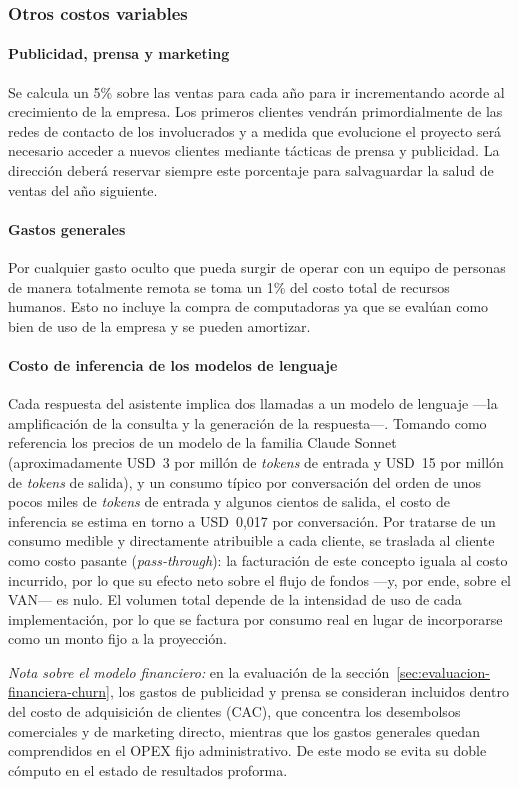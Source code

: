 \subsubsection{Otros costos variables}

\paragraph{Publicidad, prensa y marketing}
Se calcula un 5\% sobre las ventas para cada año para ir incrementando acorde al crecimiento de la empresa. Los primeros clientes vendrán primordialmente de las redes de contacto de los involucrados y a medida que evolucione el proyecto será necesario acceder a nuevos clientes mediante tácticas de prensa y publicidad. La dirección deberá reservar siempre este porcentaje para salvaguardar la salud de ventas del año siguiente.

\paragraph{Gastos generales}
Por cualquier gasto oculto que pueda surgir de operar con un equipo de personas de manera totalmente remota se toma un 1\% del costo total de recursos humanos. Esto no incluye la compra de computadoras ya que se evalúan como bien de uso de la empresa y se pueden amortizar.

\paragraph{Costo de inferencia de los modelos de lenguaje}
Cada respuesta del asistente implica dos llamadas a un modelo de lenguaje —la amplificación de la consulta y la generación de la respuesta—. Tomando como referencia los precios de un modelo de la familia Claude Sonnet (aproximadamente USD~3 por millón de \textit{tokens} de entrada y USD~15 por millón de \textit{tokens} de salida), y un consumo típico por conversación del orden de unos pocos miles de \textit{tokens} de entrada y algunos cientos de salida, el costo de inferencia se estima en torno a USD~0,017 por conversación. Por tratarse de un consumo medible y directamente atribuible a cada cliente, se traslada al cliente como costo pasante (\textit{pass-through}): la facturación de este concepto iguala al costo incurrido, por lo que su efecto neto sobre el flujo de fondos —y, por ende, sobre el VAN— es nulo. El volumen total depende de la intensidad de uso de cada implementación, por lo que se factura por consumo real en lugar de incorporarse como un monto fijo a la proyección.

\noindent\textit{Nota sobre el modelo financiero:} en la evaluación de la sección~\ref{sec:evaluacion-financiera-churn}, los gastos de publicidad y prensa se consideran incluidos dentro del costo de adquisición de clientes (CAC), que concentra los desembolsos comerciales y de marketing directo, mientras que los gastos generales quedan comprendidos en el OPEX fijo administrativo. De este modo se evita su doble cómputo en el estado de resultados proforma.